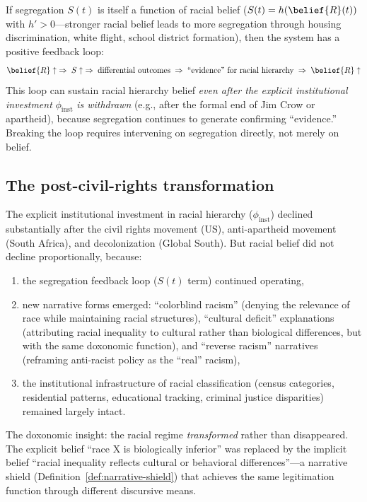 \begin{proposition}
\label{prop:segregation-feedback}
If segregation $S(t)$ is itself a function of racial belief ($S(t) = h(\belief{R}(t))$ with $h' > 0$---stronger racial belief leads to more segregation through housing discrimination, white flight, school district formation), then the system has a positive feedback loop:
\[
  \belief{R} \uparrow \;\Rightarrow\; S \uparrow \;\Rightarrow\; \text{differential outcomes} \;\Rightarrow\; \text{``evidence'' for racial hierarchy} \;\Rightarrow\; \belief{R} \uparrow
\]
This loop can sustain racial hierarchy belief \emph{even after the explicit institutional investment} $\phi_{\text{inst}}$ \emph{is withdrawn} (e.g., after the formal end of Jim Crow or apartheid), because segregation continues to generate confirming ``evidence.''
Breaking the loop requires intervening on segregation directly, not merely on belief.
\end{proposition}

\subsection{The post-civil-rights transformation}

The explicit institutional investment in racial hierarchy ($\phi_{\text{inst}}$) declined substantially after the civil rights movement (US), anti-apartheid movement (South Africa), and decolonization (Global South).
But racial belief did not decline proportionally, because:
\begin{enumerate}[nosep]
  \item the segregation feedback loop ($S(t)$ term) continued operating,
  \item new narrative forms emerged: ``colorblind racism'' (denying the relevance of race while maintaining racial structures), ``cultural deficit'' explanations (attributing racial inequality to cultural rather than biological differences, but with the same doxonomic function), and ``reverse racism'' narratives (reframing anti-racist policy as the ``real'' racism),
  \item the institutional infrastructure of racial classification (census categories, residential patterns, educational tracking, criminal justice disparities) remained largely intact.
\end{enumerate}

The doxonomic insight: the racial regime \emph{transformed} rather than disappeared.
The explicit belief ``race X is biologically inferior'' was replaced by the implicit belief ``racial inequality reflects cultural or behavioral differences''---a narrative shield (Definition~\ref{def:narrative-shield}) that achieves the same legitimation function through different discursive means.

